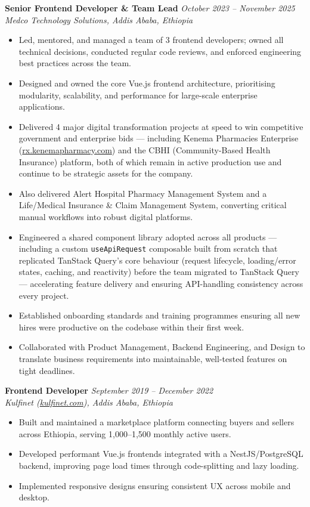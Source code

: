 \documentclass[10pt,a4paper]{article}
\begin{document}
\vspace{8pt}
\textbf{Senior Frontend Developer \& Team Lead} \hfill \textit{October 2023 -- November 2025}\\
\textit{Medco Technology Solutions, Addis Ababa, Ethiopia}
\begin{itemize}
  \item Led, mentored, and managed a team of 3 frontend developers; owned all technical decisions,
        conducted regular code reviews, and enforced engineering best practices across the team.
  \item Designed and owned the core Vue.js frontend architecture, prioritising modularity, scalability,
        and performance for large-scale enterprise applications.
  \item Delivered 4 major digital transformation projects at speed to win competitive government and
        enterprise bids --- including Kenema Pharmacies Enterprise
        (\href{https://rx.kenemapharmacy.com}{rx.kenemapharmacy.com}) and the CBHI
        (Community-Based Health Insurance) platform, both of which remain in active production use
        and continue to be strategic assets for the company.
  \item Also delivered Alert Hospital Pharmacy Management System and a Life/Medical Insurance \&
        Claim Management System, converting critical manual workflows into robust digital platforms.
  \item Engineered a shared component library adopted across all products --- including a custom
        \texttt{useApiRequest} composable built from scratch that replicated TanStack Query's core
        behaviour (request lifecycle, loading/error states, caching, and reactivity) before the team
        migrated to TanStack Query --- accelerating feature delivery and ensuring API-handling
        consistency across every project.
  \item Established onboarding standards and training programmes ensuring all new hires were
        productive on the codebase within their first week.
  \item Collaborated with Product Management, Backend Engineering, and Design to translate business
        requirements into maintainable, well-tested features on tight deadlines.
\end{itemize}

\vspace{8pt}
\textbf{Frontend Developer} \hfill \textit{September 2019 -- December 2022}\\
\textit{Kulfinet (\href{https://kulfinet.com}{kulfinet.com}), Addis Ababa, Ethiopia}
\begin{itemize}
  \item Built and maintained a marketplace platform connecting buyers and sellers across Ethiopia,
        serving 1{,}000--1{,}500 monthly active users.
  \item Developed performant Vue.js frontends integrated with a NestJS/PostgreSQL backend, improving
        page load times through code-splitting and lazy loading.
  \item Implemented responsive designs ensuring consistent UX across mobile and desktop.
\end{itemize}
\end{document}
